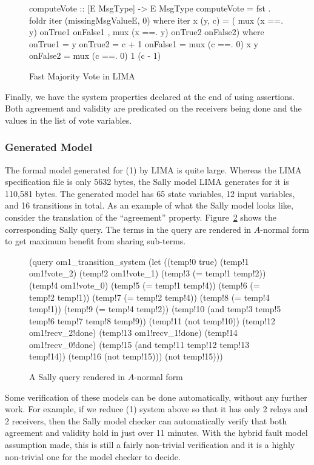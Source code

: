 \begin{figure}
\begin{lima}
computeVote :: [E MsgType] -> E MsgType
computeVote = fst . foldr iter (missingMsgValueE, 0)
  where
    iter x (y, c) = ( mux (x ==. y) onTrue1 onFalse1
                    , mux (x ==. y) onTrue2 onFalse2)
      where
        onTrue1       = y
        onTrue2       = c + 1
        onFalse1      = mux (c ==. 0) x y
        onFalse2      = mux (c ==. 0) 1 (c - 1)
\end{lima}
\caption{Fast Majority Vote in LIMA}
\label{fig:majority-vote}
\end{figure}

Finally, we have the system properties declared at the end of  using
assertions. Both agreement and validity are predicated on the receivers being
done and the values in the list of vote variables.

\subsubsection{Generated Model}\label{sssec:om1-sally-model}

The formal model generated for \OM(1) by LIMA is quite large. Whereas the LIMA
specification file is only 5632 bytes, the Sally model LIMA generates for it
is 110,581 bytes. The generated model has 65 state variables, 12 input
variables, and 16 transitions in total. As an example of what the Sally model
looks like, consider the translation of the ``agreement'' property. Figure~\ref{fig:sally-query} shows the corresponding Sally query. The terms in the
query are rendered in $A$-normal form \cite{Sabry-Felleisen} to get maximum
benefit from sharing sub-terms.

\begin{figure}
\begin{sally}
(query
 om1_transition_system
 (let
  ((temp!0 true)
   (temp!1 om1!vote_2)
   (temp!2 om1!vote_1)
   (temp!3 (= temp!1 temp!2))
   (temp!4 om1!vote_0)
   (temp!5 (= temp!1 temp!4))
   (temp!6 (= temp!2 temp!1))
   (temp!7 (= temp!2 temp!4))
   (temp!8 (= temp!4 temp!1))
   (temp!9 (= temp!4 temp!2))
   (temp!10 (and temp!3 temp!5 temp!6 temp!7 temp!8 temp!9))
   (temp!11 (not temp!10))
   (temp!12 om1!recv_2!done)
   (temp!13 om1!recv_1!done)
   (temp!14 om1!recv_0!done)
   (temp!15 (and temp!11 temp!12 temp!13 temp!14))
   (temp!16 (not temp!15)))
  (not temp!15)))
\end{sally}
\caption{A Sally query rendered in $A$-normal form}
\label{fig:sally-query}
\end{figure}

Some verification of these models can be done automatically, without any
further work. For example, if we reduce \OM(1) system above so that it has
only 2 relays and 2 receivers, then the Sally model checker can automatically
verify that both agreement and validity hold in just over 11 minutes. With the
hybrid fault model assumption made, this is still a fairly non-trivial
verification and it is a highly non-trivial one for the model checker to
decide.
